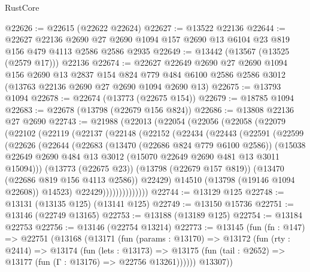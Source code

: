 \begin{lexlean}{RustCore}
\begin{coremodule}
@22626 := @22615 (@22622 @22624)
@22627 := @13522 @22136
@22644 := @22627
    @22136
    @2690
    @27
    @2690
    @1094
    @157
    @2690
    @13
    @6104
    @23
    @819
    @156
    @479
    @4113
    @2586
    @2586
    @2935
@22649 := @13442 (@13567 (@13525 (@2579 @17))) @22136
@22674 := @22627
    @22649
    @2690
    @27
    @2690
    @1094
    @156
    @2690
    @13
    @2837
    @154
    @824
    @779
    @484
    @6100
    @2586
    @2586
    @3012
    (@13763 @22136 @2690 @27 @2690 @1094 @2690 @13)
@22675 := @13793 @1094
@22678 := @22674 (@13773 (@22675 @154))
@22679 := @18785 @1094
@22683 := @22678 (@13798 (@22679 @156 @824))
@22686 := @13808 @22136 @27 @2690
@22743 := @21988
    (@22013
      (@22054
        (@22056
          (@22058
            (@22079
              (@22102
                (@22119
                  (@22137
                    (@22148
                      (@22152
                        (@22434
                          (@22443
                            (@22591
                              (@22599
                                (@22626
                                  (@22644
                                    (@22683
                                      (@13470 (@22686 @824 @779 @6100 @2586))
                                      (@15038
                                        @22649
                                        @2690
                                        @484
                                        @13
                                        @3012
                                        (@15070 @22649 @2690 @481 @13 @3011 @15094)))
                                    (@13773 (@22675 @23))
                                    (@13798 (@22679 @157 @819))
                                    (@13470 (@22686 @819 @156 @4113 @2586))
                                    @22429)
                                  @14510
                                  (@13798 (@19146 @1094 @22608))
                                  @14523)
                                @22429))))))))))))))
@22744 := @13129 @125
@22748 := @13131 (@13135 @125) (@13141 @125)
@22749 := @13150 @15736
@22751 := @13146 (@22749 @13165)
@22753 := @13188 (@13189 @125)
@22754 := @13184 @22753
@22756 := @13146 (@22754 @13214)
@22773 := @13145
    (fun (fn : @147) =>
    @22751
      (@13168
        (@13171
          (fun (params : @13170) =>
          @13172
            (fun (rty : @2414) =>
            @13174
              (fun (lets : @13173) =>
              @13175 (fun (tail : @2652) => @13177 (fun (Γ : @13176) => @22756 @13261))))))
        @13307))

\end{coremodule}
\end{lexlean}
